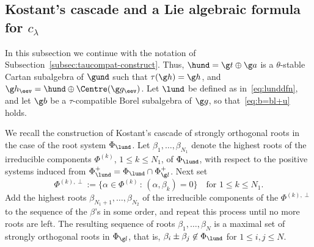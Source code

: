 \documentclass[12pt]{amsart}
\begin{document}
\subsection{Kostant's cascade and a Lie algebraic formula for $c_\lambda$}
In this subsection we continue with the notation of 
Subsection~\ref{subsec:taucompat-construct}. Thus, $\hund=\g t\oplus \g a$ is a $\theta$-stable Cartan subalgebra of $\gund$ such that $\tau(\g h)=\g h$, and $\g h_\eev=\hund \oplus \Centre(\g g_\eev)$. Let $\lund$ be defined as in~\eqref{eq:lunddfn}, and let $\g b$ be a $\tau$-compatible Borel subalgebra of $\g g$, so that~\eqref{eq:b=bl+u} holds. 

We recall the construction of Kostant's cascade of strongly orthogonal roots in the case of the root system $\Phi_{\lund}$. Let $\beta_1,\ldots,\beta_{N_1}$ denote the highest roots of the irreducible components 
$\Phi^{(k)}$, $1\leq k\leq N_1$, 
of $\Phi_{\lund}$, with respect to the positive systems induced from $\Phi_{\lund}^+=\Phi_{\lund}\cap\Phi_{\g l}^+$.
Next set \[
\Phi^{(k),\perp}:=\{\alpha\in\Phi^{(k)}\,:\,(\alpha,\beta_k)=0\} \quad\text{for }1\leq k\leq N_1.
\] Add the highest roots $\beta_{N_1+1},\ldots,\beta_{N_2}$ of the irreducible components of the $\Phi^{(k),\perp}$ to the sequence of the $\beta$'s in some order, and repeat this process until no more roots are left. The resulting sequence of roots $\beta_1,\ldots, \beta_N$ is a maximal set of strongly orthogonal roots in $\Phi_{\g l}$, that is, $\beta_i\pm\beta_j\not\in\Phi_{\lund}$ for $1\leq i,j\leq N$. 
\end{document}
